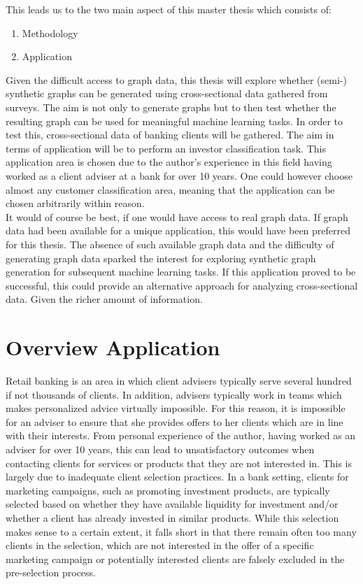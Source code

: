 	\noindent This leads us to the two main aspect of this master thesis which
	consists of:
	
	\begin{enumerate}
		\item Methodology
		\item Application
	\end{enumerate} 

	\noindent Given the difficult access to graph data, this thesis will
	explore whether (semi-) synthetic graphs can be generated using
	cross-sectional data gathered from surveys. The aim is not only to generate
	graphs but to then test whether the resulting graph can be used for
	meaningful machine learning tasks. In order to test this, cross-sectional 
	data of banking clients will be gathered. The aim in terms of application 
	will be to perform an investor classification task. This application area is
	chosen due to the author's experience in this field having worked as a
	client adviser at a bank for over 10 years. One could however choose almost
	any customer classification area, meaning that the application can be chosen
	arbitrarily within reason. \\

	\noindent It would of course be best, if one would have access to real
	graph data. If graph data had been available for a unique application, this
	would have been preferred for this thesis. The absence of such available 
	graph data and the difficulty of generating graph data sparked the interest
	for exploring synthetic graph generation for subsequent machine learning
	tasks. If this application proved to be successful, this could provide an 
	alternative approach for analyzing cross-sectional data. Given the richer
	amount of information.

	\section{Overview Application}

	Retail banking is an area in which client advisers typically serve several 
	hundred if not thousands of clients. In addition, advisers typically work
	in teams which makes personalized advice virtually impossible. For this 
	reason, it is impossible for an adviser to ensure that she provides offers
	to her clients which are in line with their interests. From personal
	experience of the author, having worked as an adviser for over 10 years, 
	this can lead to unsatisfactory outcomes when contacting clients for services or 
	products that they are not interested in. This is largely due to inadequate
	client selection practices. In a bank setting, clients for marketing 
	campaigns, such as promoting investment products, are typically selected based
	on whether they have available liquidity for investment and/or whether a 
	client has already invested in similar products. While this selection makes
	sense to a certain extent, it falls short in that there remain often too 
	many clients in the selection, which are not interested in the offer of a 
	specific marketing campaign or potentially interested clients are falsely 
	excluded in the pre-selection process. \\
	

